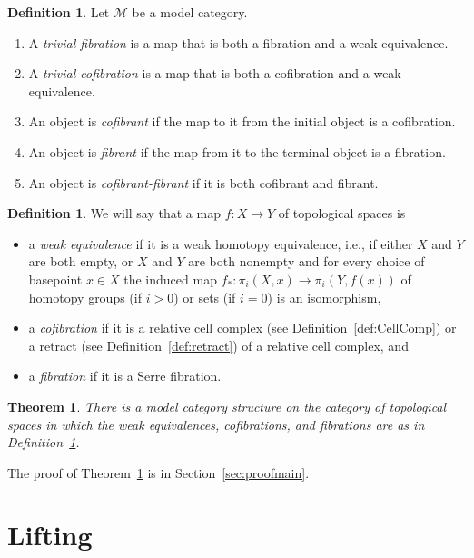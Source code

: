 \documentclass[12pt]{amsart}
\numberwithin{equation}{section}
\theoremstyle{slplain}
\newtheorem{thm}[equation]{Theorem}  %
\theoremstyle{definition}
\newtheorem{defn}[equation]{Definition} %
\theoremstyle{remark}
\newcommand{\thmref}{Theorem~\ref}
\newcommand{\defref}{Definition~\ref}
\newcommand{\secref}{Section~\ref}
\newcommand{\cat}[1]{\mathcal{#1}}
\begin{document}
\begin{defn}
  \label{def:TrivCof}
  Let $\cat M$ be a model category.
  \begin{enumerate}
  \item A \emph{trivial fibration} is a map that is both a fibration
    and a weak equivalence.
  \item A \emph{trivial cofibration} is a map that is both a
    cofibration and a weak equivalence.
  \item An object is \emph{cofibrant} if the map to it from the
    initial object is a cofibration.
  \item An object is \emph{fibrant} if the map from it to the terminal
    object is a fibration.
  \item An object is \emph{cofibrant-fibrant} if it is both cofibrant
    and fibrant.
  \end{enumerate}
\end{defn}

\begin{defn}
  \label{def:MdCtStr}
  We will say that a map $f\colon X \to Y$ of topological spaces is
  \begin{itemize}
  \item a \emph{weak equivalence} if it is a weak homotopy
    equivalence, i.e., if either $X$ and $Y$ are both empty, or $X$
    and $Y$ are both nonempty and for every choice of basepoint $x \in
    X$ the induced map $f_{*}\colon \pi_{i}(X,x) \to \pi_{i}(Y, f(x))$
    of homotopy groups (if $i > 0$) or sets (if $i = 0$) is an
    isomorphism,
  \item a \emph{cofibration} if it is a relative cell complex (see
    \defref{def:CellComp}) or a retract (see \defref{def:retract}) of
    a relative cell complex, and
  \item a \emph{fibration} if it is a Serre fibration.
  \end{itemize}
\end{defn}


\begin{thm}
  \label{thm:main}
  There is a model category structure on the category of topological
  spaces in which the weak equivalences, cofibrations, and fibrations
  are as in \defref{def:MdCtStr}.
\end{thm}

The proof of \thmref{thm:main} is in \secref{sec:proofmain}.


\section{Lifting}
\label{sec:retracts}
\end{document}
